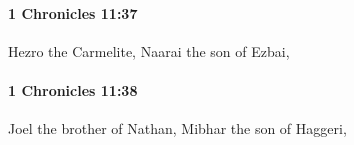 		\paragraph{1 Chronicles 11:37} %
			\label{1CHRONICLES-11-37}

			Hezro the Carmelite, Naarai the son of Ezbai,


		\paragraph{1 Chronicles 11:38} %
			\label{1CHRONICLES-11-38}

			Joel the brother of Nathan, Mibhar the son of Haggeri,


